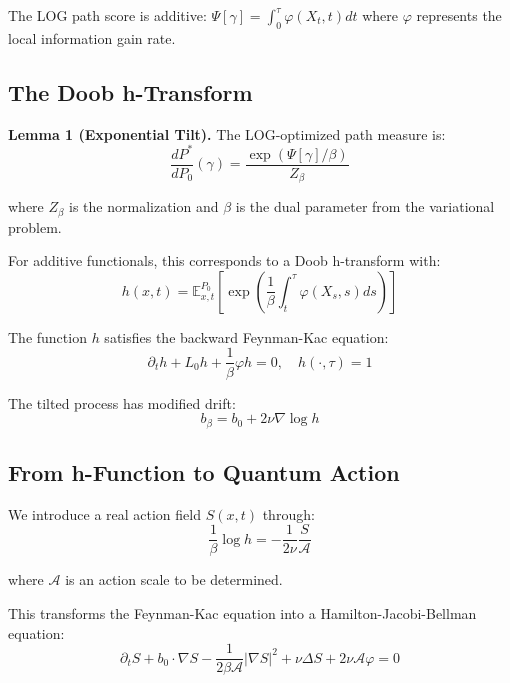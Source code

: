 \documentclass[12pt]{article}
\begin{document}
The LOG path score is additive: $\Psi[\gamma] = \int_0^\tau \varphi(X_t,t)dt$ where $\varphi$ represents the local information gain rate.

\subsection{The Doob h-Transform}

\textbf{Lemma 1 (Exponential Tilt).} The LOG-optimized path measure is:
\begin{equation}
\frac{dP^*}{dP_0}(\gamma) = \frac{\exp(\Psi[\gamma]/\beta)}{Z_\beta} \tag{3.3}
\end{equation}

where $Z_\beta$ is the normalization and $\beta$ is the dual parameter from the variational problem.

For additive functionals, this corresponds to a Doob h-transform with:
\begin{equation}
h(x,t) = \mathbb{E}_{x,t}^{P_0}\left[\exp\left(\frac{1}{\beta}\int_t^\tau \varphi(X_s,s)ds\right)\right] \tag{3.4}
\end{equation}

The function $h$ satisfies the backward Feynman-Kac equation:
\begin{equation}
\partial_t h + L_0 h + \frac{1}{\beta}\varphi h = 0, \quad h(\cdot,\tau) = 1 \tag{3.5}
\end{equation}

The tilted process has modified drift:
\begin{equation}
b_\beta = b_0 + 2\nu \nabla \log h \tag{3.6}
\end{equation}

\subsection{From h-Function to Quantum Action}

We introduce a real action field $S(x,t)$ through:
\begin{equation}
\frac{1}{\beta}\log h = -\frac{1}{2\nu} \frac{S}{\mathcal{A}} \tag{3.7}
\end{equation}

where $\mathcal{A}$ is an action scale to be determined.

This transforms the Feynman-Kac equation into a Hamilton-Jacobi-Bellman equation:
\begin{equation}
\partial_t S + b_0 \cdot \nabla S - \frac{1}{2\beta\mathcal{A}}|\nabla S|^2 + \nu \Delta S + 2\nu\mathcal{A}\varphi = 0 \tag{3.8}
\end{equation}
\end{document}
